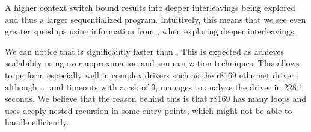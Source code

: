 A higher context switch bound results into deeper interleavings being explored and thus a larger sequentialized program. Intuitively, this means that we see even greater speedups using information from \whoop, when exploring deeper interleavings.

We can notice that \whoop is significantly faster than \corral. This is expected as \whoop achieves scalability using over-approximation and summarization techniques. This allows \whoop to perform especially well in complex drivers such as the r8169 ethernet driver: although \corral ... and timeouts with a csb of 9, \whoop manages to analyze the driver in 228.1 seconds. We believe that the reason behind this is that r8169 has many loops and uses deeply-nested recursion in some entry points, which \corral might not be able to handle efficiently.


